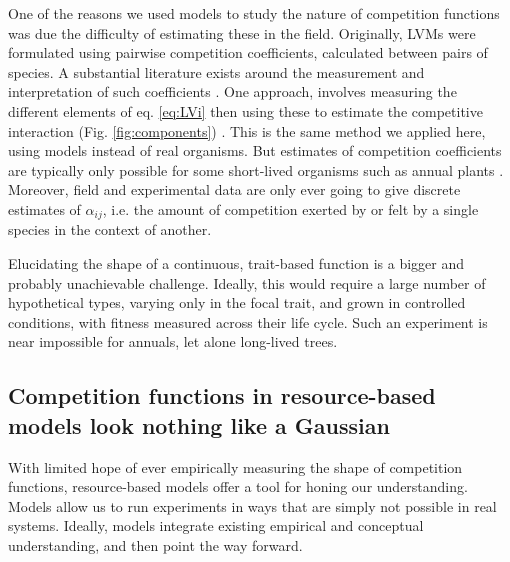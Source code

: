 \documentclass[a4paper,11pt]{article}
\begin{document}
One of the reasons we used models to study the nature of competition functions was due the difficulty of estimating these in the field. Originally, LVMs were formulated using pairwise competition coefficients, calculated between pairs of species. A substantial literature exists around the measurement and interpretation of such coefficients \citep[e.g.]{Ricklefs-1973, Abrams-1980, Law-1997a,Freckleton-2001, Kraft-2015}. One approach, involves measuring the different elements of eq. \ref{eq:LVi} then using these to estimate the competitive interaction (Fig. \ref{fig:components}) \citet{Ricklefs-1973}. This is the same method we applied here, using models instead of real organisms. But estimates of competition coefficients are typically only possible for some short-lived organisms such as annual plants \citep{Kraft-2015, Mayfield-2017, Law-1997,Freckleton-2001}. Moreover, field and experimental data are only ever going to give discrete estimates of $\alpha_{ij}$, i.e. the amount of competition exerted by or felt by a single species in the context of another. 

Elucidating the shape of a continuous, trait-based function is a bigger and probably unachievable challenge. Ideally, this would require a large number of hypothetical types, varying only in the focal trait, and grown in controlled conditions, with fitness measured across their life cycle. Such an experiment is near impossible for annuals, let alone long-lived trees.

\subsection{Competition functions in resource-based models look nothing like a  Gaussian}

With limited hope of ever empirically measuring the shape of competition functions, resource-based models offer a tool for honing our understanding. Models allow us to run experiments in ways that are simply not possible in real systems. Ideally, models integrate existing empirical and conceptual understanding, and then point the way forward.
\end{document}
